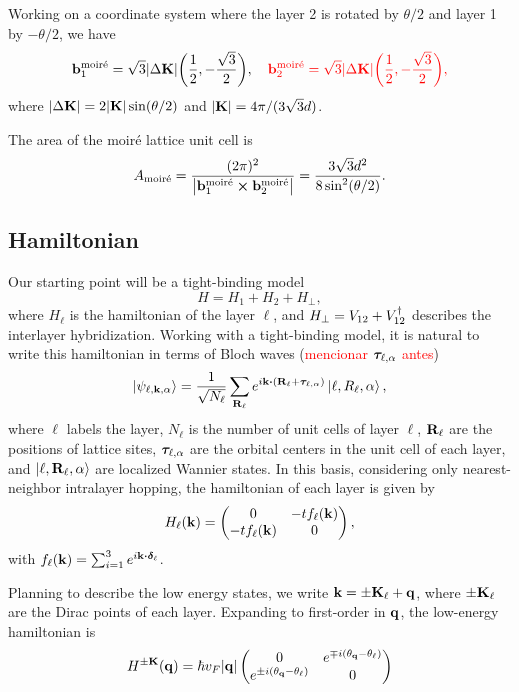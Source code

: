 \documentclass[a4paper,10pt]{article}
\begin{document}
\n

Working on a coordinate system where the layer 2 is rotated by $\theta/2$ and layer 1 by $-\theta/2$, we have
$$
\vb{b}_1^{\text{moiré}} = \sqrt{3} \abs{\Delta {\vb{K}}} \qty(\frac{1}{2}, -\frac{\sqrt{3}}{2}), \quad
\textcolor{red}{\vb{b}_2^{\text{moiré}} = \sqrt{3} \abs{\Delta {\vb{K}}} \qty(\frac{1}{2}, -\frac{\sqrt{3}}{2}),}
$$
where $\abs{\Delta {\vb{K}}} = 2 \abs{{\vb{K}}} \sin(\theta/2)$ and $\abs{{\vb{K}}} = 4\pi/(3\sqrt{3} d)$.

The area of the moiré lattice unit cell is
$$
A_{\text{moiré}} = \frac{(2\pi)^2}{\abs{{\vb{b}}_1^{\text{moiré}} \cross {\vb{b}}_2^{\text{moiré}}}} = \frac{3\sqrt{3} d^2}{8 \sin[2](\theta/2)}.
$$

\subsection{Hamiltonian}

Our starting point will be a tight-binding model
$$
H = H_1 + H_2 + H_{\perp},
$$
where $H_\ell$ is the hamiltonian of the layer $\ell$, and $H_\perp = V_{12} + V_{12}^{\dagger}$ describes the interlayer hybridization. Working with a tight-binding model, it is natural to write this hamiltonian in terms of Bloch waves (\textcolor{red}{mencionar ${\bm{\tau}}_{\ell,\alpha}$ antes})
$$
\ket{\psi_{\ell, \k, \alpha}} = \frac{1}{\sqrt{N_\ell}} \sum_{\R_\ell} e^{i \k \vdot (\R_\ell + \vtau_{\ell,\alpha})} \ket{\ell, R_\ell, \alpha},
$$
where $\ell$ labels the layer, $N_\ell$ is the number of unit cells of layer $\ell$, ${\vb{R}}_\ell$ are the positions of lattice sites, ${\bm{\tau}}_{\ell,\alpha}$ are the orbital centers in the unit cell of each layer, and $\ket{\ell,{\vb{R}}_\ell,\alpha}$ are localized Wannier states. In this basis, considering only nearest-neighbor intralayer hopping, the hamiltonian of each layer is given by
$$
H_\ell({\vb{k}}) =
\begin{pmatrix}
0 & -t f_\ell({\vb{k}}) \\
-t f_\ell({\vb{k}}) & 0
\end{pmatrix},
$$
with $f_\ell(\k) = \sum_{i=1}^{3} e^{i\k \vdot \vdelta_\ell}$.

Planning to describe the low energy states, we write ${\vb{k}} = \pm {\vb{K}}_\ell + {\vb{q}}$, where $\pm {\vb{K}}_\ell$ are the Dirac points of each layer. Expanding to first-order in ${\vb{q}}$, the low-energy hamiltonian is
$$
H^{\pm {\vb{K}}}({\vb{q}}) = \hbar v_F \abs{{\vb{q}}}
\begin{pmatrix}
0 & e^{\mp i (\theta_{\vb{q}} - \theta_\ell)} \\
e^{\pm i (\theta_{\vb{q}} - \theta_\ell)} & 0
\end{pmatrix}
$$
\end{document}
